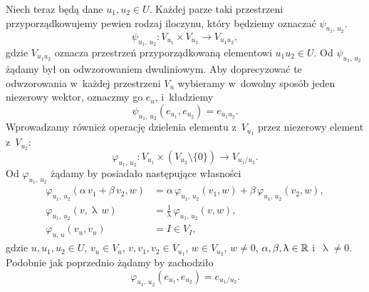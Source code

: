 \documentclass[a4paper,11pt]{article}
\numberwithin{equation}{section}
\renewcommand{\lambda}{\uplambda}
\begin{document}
Niech teraz będą dane $u_{ 1 }, u_{ 2 } \in U$. Każdej parze taki przestrzeni
przyporządkowujemy pewien rodzaj iloczynu, który będziemy oznaczać
$\psi_{ u_{ 1 }, \, u_{ 2 } }$.
\begin{equation}
  \label{eq:Mechanika-Rozwazania-ogolne-07}
  \psi_{ u_{ 1 }, \, u_{ 2 } } :
  V_{ u_{ 1 } } \times V_{ u_{ 2 } } \to V_{ u_{ 1 } u_{ 2 } },
\end{equation}
gdzie $V_{ u_{ 1 } u _{ 2 } }$ oznacza przestrzeń przyporządkowaną elementowi
$u_{ 1 } u_{ 2 } \in U$. Od $\psi_{ u_{ 1 }, \, u_{ 2 } }$ żądamy był on
odwzorowaniem dwuliniowym. Aby doprecyzować te odwzorowania w~każdej
przestrzeni $V_{ u }$ wybieramy w~dowolny sposób jeden niezerowy wektor,
oznaczmy go $e_{ u }$, i~kładziemy
\begin{equation}
  \label{eq:Mechanika-Rozwazania-ogolne-08}
  \psi_{ u_{ 1 }, \, u_{ 2 } }( e_{ u_{ 1 } }, e_{ u_{ 2 } } ) = e_{ u_{ 1 } u_{ 2 } }.
\end{equation}
Wprowadzamy również operację dzielenia elementu z~$V_{ u_{ 1 } }$ przez
niezerowy element z~$V_{ u_{ 2 } }$:
\begin{equation}
  \label{eq:Mechanika-Rozwazania-ogolne-09}
  \varphi_{ u_{ 1 },\, u_{ 2 } } :
  V_{ u_{ 1 } } \times ( V_{ u_{ 2 } } \setminus \{ 0 \} ) \to V_{ u_{ 1 } / u_{ 2 } }.
\end{equation}
Od $\varphi_{ u_{ 1 }, \, u_{ 2 } }$ żądamy by posiadało następujące własności
\begin{subequations}
  \begin{align}
    \label{eq:Mechanika-Rozwazania-ogolne-10-A}
    \varphi_{ u_{ 1 }, \, u_{ 2 } }( \alpha \, v_{ 1 } + \beta \, v_{ 2 }, w )
    &= \alpha \, \varphi_{ u_{ 1 }, \, u_{ 2 } }( v_{ 1 }, w )
      + \beta \, \varphi_{ u_{ 1 }, \, u_{ 2 } }( v_{ 2 }, w ), \\
    \label{eq:Mechanika-Rozwazania-ogolne-10-B}
    \varphi_{ u_{ 1 }, \, u_{ 2 } }( v, \lambda \, w )
    &= \frac{ 1 }{ \lambda } \, \varphi_{ u_{ 1 }, \, u_{ 2 } }( v, w ), \\
    \label{eq:Mechanika-Rozwazania-ogolne-10-C}
    \varphi_{ u, \, u }( v_{ u }, v_{ u } ) &= I \in V_{ I },
  \end{align}
\end{subequations}
gdzie $u, u_{ 1 }, u_{ 2 } \in U$, $v_{ u } \in V_{ u }$,
$v, v_{ 1 }, v_{ 2 } \in V_{ u_{ 1 } }$, $w \in V_{ u_{ 2 } }$, $w \neq 0$,
$\alpha, \beta, \lambda \in \Rbb$ i~$\lambda \neq 0$. Podobnie jak poprzednio żądamy by zachodziło
\begin{equation}
  \label{eq:Mechanika-Rozwazania-ogolne-11}
  \varphi_{ u_{ 1 }, \, u_{ 2 } }( e_{ u_{ 1 } }, e_{ u_{ 2 } } ) = e_{ u_{ 1 } / u_{ 2 } }.
\end{equation}
\end{document}
